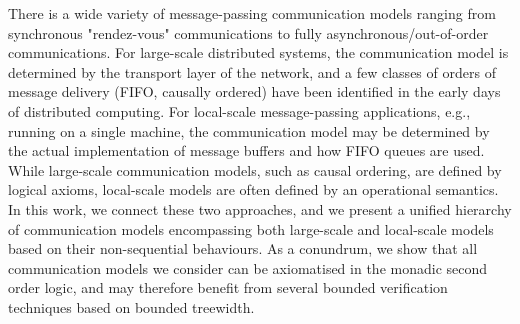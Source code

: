 There is a wide variety of message-passing communication models ranging from synchronous "rendez-vous" 
communications to fully asynchronous/out-of-order communications. For large-scale distributed systems, the
communication model is determined by the transport layer of the network, and a few classes of 
orders of message delivery (FIFO, causally ordered) have been identified in the early days of 
distributed computing. For local-scale message-passing applications, 
e.g., running on a single machine, the communication model may be determined by the actual implementation of 
message buffers and how FIFO queues are used. While large-scale communication
models, such as causal ordering, are defined by logical axioms, local-scale models are often defined by an operational
semantics. In this work, we connect these two approaches, and we present a unified hierarchy of communication
models encompassing both large-scale and local-scale models based on their non-sequential behaviours.
As a conundrum, we show that all communication models we consider can be axiomatised in the monadic second order logic,
and may therefore benefit from several bounded verification techniques based on bounded treewidth.
